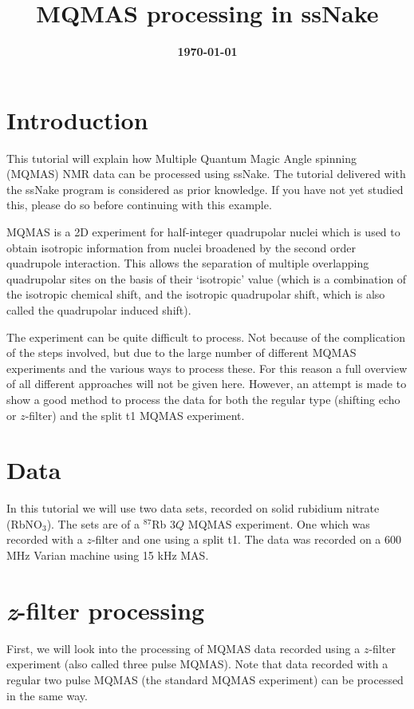 \documentclass[11pt,a4paper]{article}
\title{\color{black}\fontfamily{SourceSansPro-LF}\bfseries MQMAS processing in ssNake}
\author{}
\date{\color{black}\fontfamily{SourceSansPro-LF}\bfseries \today}
\begin{document}

\maketitle

\section{Introduction}
This tutorial will explain how Multiple Quantum Magic Angle spinning (MQMAS) NMR data can be processed using ssNake.
The tutorial delivered with the ssNake program is considered as prior knowledge.
If you have not yet studied this, please do so before continuing with this example.

MQMAS is a 2D experiment for half-integer quadrupolar nuclei which is used to obtain isotropic information from nuclei broadened by the second order quadrupole interaction.
This allows the separation of multiple overlapping quadrupolar sites on the basis of their `isotropic' value (which is a combination of the isotropic chemical shift, and the isotropic quadrupolar shift, which is also called the quadrupolar induced shift). 

The experiment can be quite difficult to process.
Not because of the complication of the steps involved, but due to the large number of different MQMAS experiments and the various ways to process these.
For this reason a full overview of all different approaches will not be given here.
However, an attempt is made to show a good method to process the data for both the regular type (shifting echo or $z$-filter) and the split t1 MQMAS experiment.


\section{Data}
In this tutorial we will use two data sets, recorded on solid rubidium nitrate (RbNO$_3$).
The sets are of a $^{87}$Rb $3Q$ MQMAS experiment.
One which was recorded with a $z$-filter and one using a split t1.
The data was recorded on a 600 MHz Varian machine using 15 kHz MAS.


\section{\textit{z}-filter processing}
First, we will look into the processing of MQMAS data recorded using a $z$-filter experiment (also called three pulse MQMAS).
Note that data recorded with a regular two pulse MQMAS (the standard MQMAS experiment) can be processed in the same way.
\end{document}
